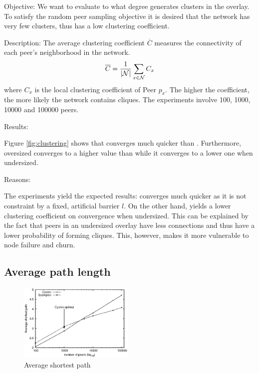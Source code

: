 \begin{asparadesc}
\item[Objective:]
    We want to evaluate to what degree \SCAMPLON{} generates clusters in the overlay.
    To satisfy the random peer sampling objective it is desired that the network has very few clusters,
    thus has a low clustering coefficient.
\item[Description:] 
    The average clustering coefficient $\overline{C}$  measures the connectivity of each peer's neighborhood in the network.
  \begin{equation}
    \overline{C} = {1\over |\mathcal{N}|}\sum\limits_{x\in\mathcal{N}}C_x
    \end{equation}
    where $C_x$ is the local clustering coefficient of Peer $p_x$. The higher
    the coefficient, the more likely the network contains cliques. 
    The experiments involve 100, 1000, 10000 and 100000 peers. 


\item[Results:]

    Figure \ref{fig:clustering} shows that \SCAMPLON{} converges much quicker than \CYCLON{}.
    Furthermore, oversized \CYCLON{} converges to a higher value than \SCAMPLON while 
    it converges to a lower one when undersized.

\item[Reasons:]

    The experiments yield the expected results: 
    \SCAMPLON{} converges much quicker as it is not constraint by a fixed, artificial barrier $l$.
    On the other hand, \CYCLON{} yields a lower clustering coefficient on convergence when undersized.
    This can be explained by the fact that peers in an undersized \CYCLON{} overlay have less connections and 
    thus have a lower probability of forming cliques.
    This, however, makes it more vulnerable to node failure and churn.

\end{asparadesc}



\subsection{Average path length}

\begin{figure}
    \centering
    \includegraphics[width=0.49\textwidth]{img/avgpath.eps}
    \caption{Average shortest path}
    \label{fig:avgpath}
\end{figure}

